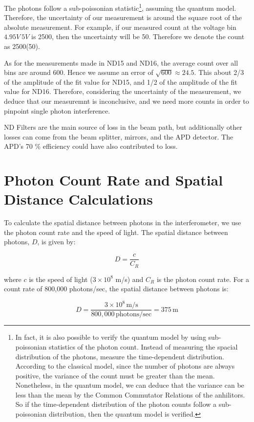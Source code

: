 \documentclass{article}
\numberwithin{equation}{section}
\begin{document}
The photons follow a sub-poissonian statistic\footnote{
    In fact, it is also possible to verify the quantum model 
    by using sub-poissonian statistics of the photon count. 
    Instead of measuring the spacial distribution of the 
    photons, measure the time-dependent distribution. According to 
    the classical model, since the number of photons are always positive, 
    the variance of the count must be greater than the mean. Nonetheless, 
    in the quantum model, we can deduce that the variance can be less 
    than the mean by the Common Commutator Relations of the anhilitors. 
    So if the time-dependent distribution of the photon counts follow 
    a sub-poissonian distribution, then the quantum model is verified. 
}, assuming the quantum model. 
Therefore, the uncertainty of our measurement is around the square root 
of the absolute measurement. For example, if our measured count 
at the voltage bin $4.95V~5V$ is 2500, then the uncertainty will be 
50. Therefore we denote the count as 2500(50). 

As for the measurements made in ND15 and ND16, the average count 
over all bins are around 600. Hence we assume an error of $\sqrt{600} \approx 24.5$. 
This about 2/3 of the amplitude of the fit value for ND15, and 1/2 of the amplitude 
of the fit value for ND16. Therefore, considering the uncertainty of the measurement, 
we deduce that our measuremnt is inconclusive, and we need more counts in order to 
pinpoint single photon interference. 

ND Filters are the main source of loss in the beam path, but additionally other losses can come from the beam splitter, mirrors, and the APD detector. The APD’s 70 \% efficiency could have also contributed to loss. 

\section{Photon Count Rate and Spatial Distance Calculations}

To calculate the spatial distance between photons in the interferometer, we use the photon count rate and the speed of light. The spatial distance between photons, $D$, is given by:

\[
D = \frac{c}{C_R}
\]

where $c$ is the speed of light ($3 \times 10^8$ m/s) and $C_R$ is the photon count rate. For a count rate of 800,000 photons/sec, the spatial distance between photons is:

\[
D = \frac{3 \times 10^8 \, \text{m/s}}{800,000 \, \text{photons/sec}} = 375 \, \text{m}
\]
\end{document}
